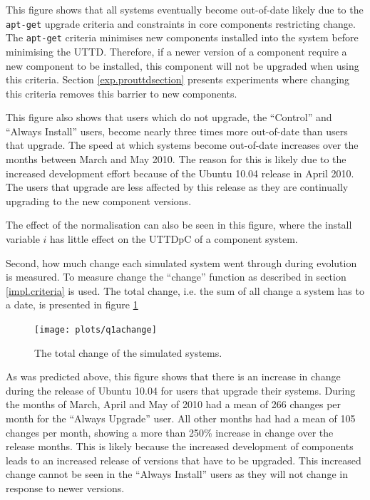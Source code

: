 This figure shows that all systems eventually become out-of-date likely due to the \texttt{apt-get} upgrade criteria and constraints in core components restricting change.
The \texttt{apt-get} criteria minimises new components installed into the system before minimising the UTTD.
Therefore, if a newer version of a component require a new component to be installed, this component will not be upgraded when using this criteria.
Section \ref{exp.prouttdsection} presents experiments where changing this criteria removes this barrier to new components. 


This figure also shows that users which do not upgrade, the ``Control'' and ``Always Install'' users, become nearly three times more out-of-date than users that upgrade.
The speed at which systems become out-of-date increases over the months between March and May 2010.
The reason for this is likely due to the increased development effort because of the Ubuntu 10.04 release in April 2010.
The users that upgrade are less affected by this release as they are continually upgrading to the new component versions.

The effect of the normalisation can also be seen in this figure, where the install variable $i$ has little effect on the UTTDpC of a component system.

Second, how much change each simulated system went through during evolution is measured.
To measure change the ``change'' function as described in section \ref{impl.criteria} is used.
The total change, i.e. the sum of all change a system has to a date, is presented in figure \ref{exp.q1achange}
\begin{figure}[htp]
\begin{center}
  \texttt{[image: plots/q1achange]}
  \caption{The total change of the simulated systems.}
  \label{exp.q1achange}
\end{center}
\end{figure}

As was predicted above, this figure shows that there is an increase in change during the release of Ubuntu 10.04 for users that upgrade their systems.
During the months of March, April and May of 2010 had a mean of 266 changes per month for the ``Always Upgrade'' user.
All other months had had a mean of 105 changes per month, showing a more than 250\% increase in change over the release months.
This is likely because the increased development of components leads to an increased release of versions that have to be upgraded.
This increased change cannot be seen in the ``Always Install'' users as they will not change in response to newer versions.

